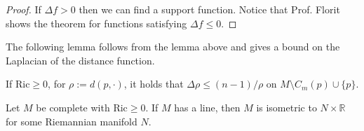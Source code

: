 \begin{proof}
If $\Delta f>0$ then we can find a support function. Notice that Prof. Florit
shows the theorem for functions satisfying $\Delta f \leq 0$.
\end{proof}

The following lemma follows from the lemma above and gives a bound on the
Laplacian of the distance function.

\begin{lemma}[Calabi]
\label{lemma-Calabi}
If $\text{Ric} \geq 0$, for $\rho:=d(p,\cdot)$, it holds that 
$\Delta\rho \leq (n-1)/\rho$ on $M\setminus C_m(p)\cup\{p\}$.
\end{lemma}


\begin{theorem}
\label{theorem-splitting}
Let $M$ be complete with  $\text{Ric}\geq0$. If $M$ has a line, then $M$ is
isometric to $N\times\mathbb{R}$ for some Riemannian manifold $N$.
\end{theorem}



\clearpage





